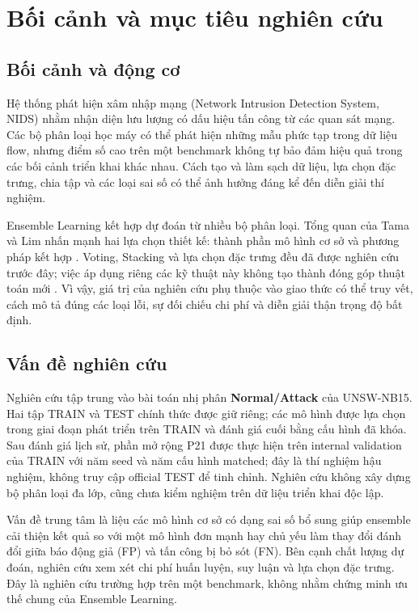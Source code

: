 \section{Bối cảnh và mục tiêu nghiên cứu}
\label{chap:gioi-thieu}

\subsection{Bối cảnh và động cơ}
Hệ thống phát hiện xâm nhập mạng (Network Intrusion Detection System, NIDS) nhằm nhận diện lưu lượng có dấu hiệu tấn công từ các quan sát mạng. Các bộ phân loại học máy có thể phát hiện những mẫu phức tạp trong dữ liệu flow, nhưng điểm số cao trên một benchmark không tự bảo đảm hiệu quả trong các bối cảnh triển khai khác nhau. Cách tạo và làm sạch dữ liệu, lựa chọn đặc trưng, chia tập và các loại sai số có thể ảnh hưởng đáng kể đến diễn giải thí nghiệm.

Ensemble Learning kết hợp dự đoán từ nhiều bộ phân loại. Tổng quan của Tama và Lim nhấn mạnh hai lựa chọn thiết kế: thành phần mô hình cơ sở và phương pháp kết hợp \cite{legacyL01}. Voting, Stacking và lựa chọn đặc trưng đều đã được nghiên cứu trước đây; việc áp dụng riêng các kỹ thuật này không tạo thành đóng góp thuật toán mới \cite{legacyL04,legacyL05,legacyL06,legacyL12}. Vì vậy, giá trị của nghiên cứu phụ thuộc vào giao thức có thể truy vết, cách mô tả đúng các loại lỗi, sự đối chiếu chi phí và diễn giải thận trọng độ bất định.

\subsection{Vấn đề nghiên cứu}
Nghiên cứu tập trung vào bài toán nhị phân \textbf{Normal/Attack} của UNSW-NB15. Hai tập TRAIN và TEST chính thức được giữ riêng; các mô hình được lựa chọn trong giai đoạn phát triển trên TRAIN và đánh giá cuối bằng cấu hình đã khóa. Sau đánh giá lịch sử, phần mở rộng P21 được thực hiện trên internal validation của TRAIN với năm seed và năm cấu hình matched; đây là thí nghiệm hậu nghiệm, không truy cập official TEST để tinh chỉnh. Nghiên cứu không xây dựng bộ phân loại đa lớp, cũng chưa kiểm nghiệm trên dữ liệu triển khai độc lập.

Vấn đề trung tâm là liệu các mô hình cơ sở có dạng sai số bổ sung giúp ensemble cải thiện kết quả so với một mô hình đơn mạnh hay chủ yếu làm thay đổi đánh đổi giữa báo động giả (FP) và tấn công bị bỏ sót (FN). Bên cạnh chất lượng dự đoán, nghiên cứu xem xét chi phí huấn luyện, suy luận và lựa chọn đặc trưng. Đây là nghiên cứu trường hợp trên một benchmark, không nhằm chứng minh ưu thế chung của Ensemble Learning.

